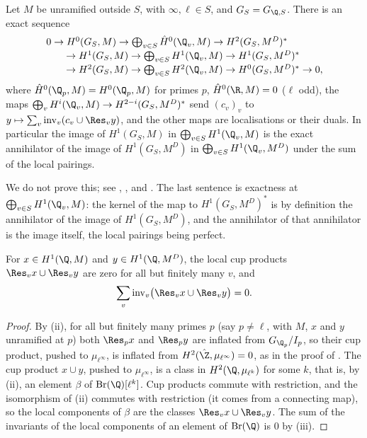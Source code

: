 \begin{theorem}\label{thm:galcoh:poitou-tate}
Let $M$ be unramified outside $S$, with $\infty,\ell\in S$, and $G_S=G_{\Q,S}$. There is an exact sequence
\[
\begin{array}{l}
0\to H^0(G_S,M)\to\bigoplus_{v\in S}\hat H^0(\Q_v,M)\to H^2(G_S,M^D)^*\\[2pt]
\qquad\to H^1(G_S,M)\to\bigoplus_{v\in S}H^1(\Q_v,M)\to H^1(G_S,M^D)^*\\[2pt]
\qquad\to H^2(G_S,M)\to\bigoplus_{v\in S}H^2(\Q_v,M)\to H^0(G_S,M^D)^*\to0,
\end{array}
\]
where $\hat H^0(\Q_p,M)=H^0(\Q_p,M)$ for primes $p$, $\hat H^0(\R,M)=0$ ($\ell$ odd), the maps $\bigoplus_vH^i(\Q_v,M)\to H^{2-i}(G_S,M^D)^*$ send $(c_v)_v$ to
$y\mapsto\sum_v\operatorname{inv}_v(c_v\cup\Res_vy)$, and the other maps are localisations or their duals. In particular the image of $H^1(G_S,M)$ in $\bigoplus_{v\in S}H^1(\Q_v,M)$ is the
exact annihilator of the image of $H^1(G_S,M^D)$ in $\bigoplus_{v\in S}H^1(\Q_v,M^D)$ under the sum of the local pairings.
\end{theorem}

\noindent We do not prove this; see \cite[Chapter I, Section 4]{MilneADT}, \cite[Chapter VIII, Section 6]{NSW}, \cite{TateDuality} and \cite[Section 1.7]{Rubin}. The
last sentence is exactness at $\bigoplus_{v\in S}H^1(\Q_v,M)$: the kernel of the map to $H^1(G_S,M^D)^*$ is by definition the annihilator of the image of $H^1(G_S,M^D)$, and
the annihilator of that annihilator is the image itself, the local pairings being perfect.

\begin{proposition}[reciprocity]\label{prop:galcoh:reciprocity}
For $x\in H^1(\Q,M)$ and $y\in H^1(\Q,M^D)$, the local cup products $\Res_vx\cup\Res_vy$ are zero for all but finitely many $v$, and
\[
\sum_v\operatorname{inv}_v\bigl(\Res_vx\cup\Res_vy\bigr)=0 .
\]
\end{proposition}

\begin{proof}
By (ii), for all but finitely many primes $p$ (say $p\ne\ell$, with $M$, $x$ and $y$ unramified at $p$) both $\Res_px$ and $\Res_py$
are inflated from $G_{\Q_p}/I_p$, so their cup product, pushed to $\mu_{\ell^\infty}$, is inflated from $H^2(\hat\Z,\mu_{\ell^\infty})=0$, as in the proof of
. The cup product $x\cup y$, pushed to $\mu_{\ell^\infty}$, is a class in $H^2(\Q,\mu_{\ell^k})$ for some $k$, that is, by
(ii), an element $\beta$ of $\operatorname{Br}(\Q)[\ell^k]$. Cup products commute with restriction, and the isomorphism of (ii) commutes
with restriction (it comes from a connecting map), so the local components of $\beta$ are the classes $\Res_vx\cup\Res_vy$. The sum of the invariants of the local
components of an element of $\operatorname{Br}(\Q)$ is $0$ by (iii).
\end{proof}

